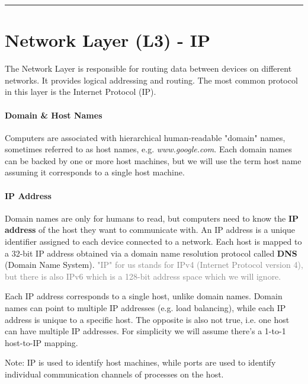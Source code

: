 \documentclass[openany,12pt]{book}
\newcommand{\gray}[1]{\textcolor{gray}{#1}}
\begin{document}
\noindent\rule{\linewidth}{0.5pt}



\section*{Network Layer (L3) - IP}

The Network Layer is responsible for routing data between devices on different networks. It provides logical addressing and routing. The most common protocol in this layer is the Internet Protocol (IP).

\paragraph{Domain \& Host Names} Computers are associated with hierarchical human-readable "domain" names, sometimes referred to as host names, e.g. \textit{www.google.com}. Each domain names can be backed by one or more host machines, but we will use the term host name assuming it corresponds to a single host machine.


\paragraph{IP Address} Domain names are only for humans to read, but computers need to know the \textbf{IP address} of the host they want to communicate with. An IP address is a unique identifier assigned to each device connected to a network. Each host is mapped to a 32-bit IP address obtained via a domain name resolution protocol called \textbf{DNS} (Domain Name System). \gray{"IP" for us stands for IPv4 (Internet Protocol version 4), but there is also IPv6 which is a 128-bit address space which we will ignore.}

Each IP address corresponds to a single host, unlike domain names. Domain names can point to multiple IP addresses (e.g. load balancing), while each IP address is unique to a specific host. The opposite is also not true, i.e. one host can have multiple IP addresses. For simplicity we will assume there's a 1-to-1 host-to-IP mapping.

Note: IP is used to identify host machines, while ports are used to identify individual communication channels of processes on the host.
\end{document}
